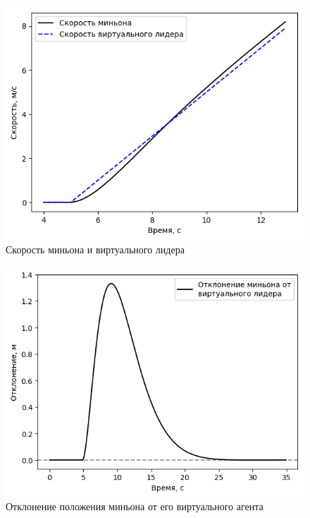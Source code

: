 \documentclass[a4paper, 14pt]{extarticle}
\begin{document}
\begin{figure}[!htbp]
	\centering
	\includegraphics[width=0.6\linewidth]{minion/heviside_velocity}
	\caption{Скорость миньона и виртуального лидера}
	\label{fig:hevisidevelocity}
\end{figure}
\begin{figure}
	\centering
	\includegraphics[width=0.6\linewidth]{minion/heviside_targerr}
	\caption{Отклонение положения миньона от его виртуального агента}
	\label{fig:hevisidetargerr}
\end{figure}
\end{document}
